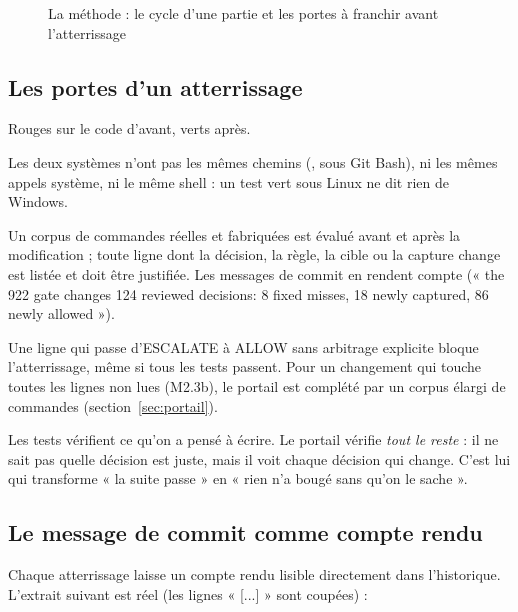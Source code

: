 \begin{figure}[htbp]
\centering
\makebox[\linewidth][c]{}
\caption{La méthode : le cycle d'une partie et les portes à franchir avant l'atterrissage}
\label{fig:methode}
\end{figure}

\subsection{Les portes d'un atterrissage}
\begin{description}[style=nextline,leftmargin=0.6cm,font=\sffamily\bfseries]
  \item[Les tests de la partie] Rouges sur le code d'avant, verts après.
  \item[La suite complète, sous Linux et sous Windows] Les deux systèmes n'ont pas les mêmes
    chemins (,  sous Git Bash), ni les mêmes appels système, ni le
    même shell : un test vert sous Linux ne dit rien de Windows.
  \item[Le portail de décision] Un corpus de \nbcorpus{} commandes réelles et fabriquées est
    évalué avant et après la modification ; toute ligne dont la décision, la règle, la
    cible ou la capture change est listée et doit être justifiée. Les messages de commit en
    rendent compte (« the 922 gate changes 124 reviewed decisions: 8 fixed misses,
    18 newly captured, 86 newly allowed »).
  \item[Aucune décision plus permissive sans arbitrage] Une ligne qui passe d'ESCALATE à ALLOW
    sans arbitrage explicite bloque l'atterrissage, même si tous les tests passent.
    Pour un changement qui touche toutes les lignes non lues (M2.3b), le portail est complété
    par un corpus élargi de \nbcorpuslarge{} commandes (section~\ref{sec:portail}).
\end{description}

\begin{pourquoi}
Les tests vérifient ce qu'on a pensé à écrire. Le portail vérifie \emph{tout le reste} :
il ne sait pas quelle décision est juste, mais il voit chaque décision qui change. C'est
lui qui transforme « la suite passe » en « rien n'a bougé sans qu'on le sache ».
\end{pourquoi}

\subsection{Le message de commit comme compte rendu}
Chaque atterrissage laisse un compte rendu lisible directement dans l'historique.
L'extrait suivant est réel (les lignes « [...] » sont coupées) :

